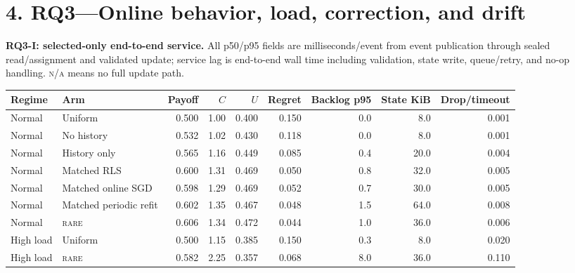 \documentclass[10pt,a4paper,landscape]{article}
\newcommand{\rare}{\textsc{rare}}\newcommand{\na}{\textsc{n/a}}\newcommand{\nog}{\textsc{no-go}}\newcommand{\ok}{\textsc{pass}}
\begin{document}
\section*{4. RQ3---Online behavior, load, correction, and drift}
\textbf{RQ3-I: selected-only end-to-end service.} All p50/p95 fields are milliseconds/event from event publication through sealed read/assignment and validated update; service lag is end-to-end wall time including validation, state write, queue/retry, and no-op handling. \na{} means no full update path.
\begin{center}\scriptsize\begin{tabular}{llrrrrrrr}\toprule Regime & Arm & Payoff & $C$ & $U$ & Regret & Backlog p95 & State KiB & Drop/timeout \\\midrule
Normal & Uniform & 0.500 & 1.00 & 0.400 & 0.150 & 0.0 & 8.0 & 0.001 \\

Normal & No history & 0.532 & 1.02 & 0.430 & 0.118 & 0.0 & 8.0 & 0.001 \\

Normal & History only & 0.565 & 1.16 & 0.449 & 0.085 & 0.4 & 20.0 & 0.004 \\

Normal & Matched RLS & 0.600 & 1.31 & 0.469 & 0.050 & 0.8 & 32.0 & 0.005 \\

Normal & Matched online SGD & 0.598 & 1.29 & 0.469 & 0.052 & 0.7 & 30.0 & 0.005 \\

Normal & Matched periodic refit & 0.602 & 1.35 & 0.467 & 0.048 & 1.5 & 64.0 & 0.008 \\

Normal & \rare{} & 0.606 & 1.34 & 0.472 & 0.044 & 1.0 & 36.0 & 0.006 \\

High load & Uniform & 0.500 & 1.15 & 0.385 & 0.150 & 0.3 & 8.0 & 0.020 \\

High load & \rare{} & 0.582 & 2.25 & 0.357 & 0.068 & 8.0 & 36.0 & 0.110 \\

\bottomrule\end{tabular}\end{center}
\end{document}
